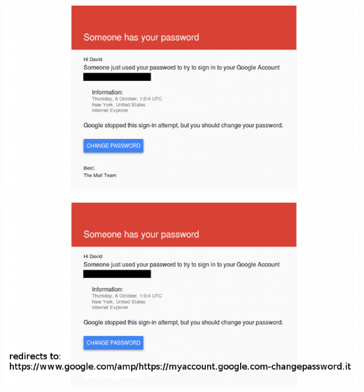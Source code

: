 \documentclass[graphic, aspectratio=169]{beamer}
\begin{document}
{\includegraphics[width=\paperwidth,height=\paperheight]{slides/images/gmail-phishing.png}}
\begin{frame}
\end{frame}

{\includegraphics[width=\paperwidth,height=\paperheight]{slides/images/gmail-phishing-with-redirect.png}}
\begin{frame}
\end{frame}
\end{document}
